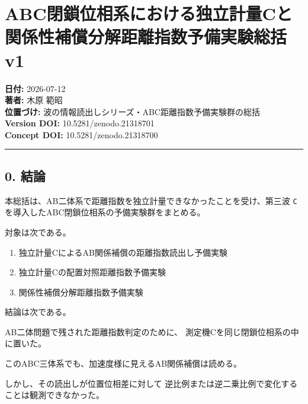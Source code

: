 \documentclass[
]{article}
\author{}
\date{}
\newenvironment{Shaded}{}{}
\newcommand{\NormalTok}[1]{#1}
\providecommand{\tightlist}{%
  \setlength{\itemsep}{0pt}\setlength{\parskip}{0pt}}
\begin{document}
\section{ABC閉鎖位相系における独立計量Cと関係性補償分解距離指数予備実験総括
v1}\label{abcux9589ux9396ux4f4dux76f8ux7cfbux306bux304aux3051ux308bux72ecux7acbux8a08ux91cfcux3068ux95a2ux4fc2ux6027ux88dcux511fux5206ux89e3ux8dddux96e2ux6307ux6570ux4e88ux5099ux5b9fux9a13ux7dcfux62ec-v1}

\textbf{日付:} 2026-07-12\\
\textbf{著者:} 木原 範昭\\
\textbf{位置づけ:} 波の情報読出しシリーズ・ABC距離指数予備実験群の総括\\
\textbf{Version DOI:} 10.5281/zenodo.21318701\\
\textbf{Concept DOI:} 10.5281/zenodo.21318700

\begin{center}\rule{0.5\linewidth}{0.5pt}\end{center}

\subsection{0. 結論}\label{ux7d50ux8ad6}

本総括は、AB二体系で距離指数を独立計量できなかったことを受け、第三波
\texttt{C} を導入したABC閉鎖位相系の予備実験群をまとめる。

対象は次である。

\begin{enumerate}
\def\labelenumi{\arabic{enumi}.}
\tightlist
\item
  独立計量CによるAB関係補償の距離指数読出し予備実験
\item
  独立計量Cの配置対照距離指数予備実験
\item
  関係性補償分解距離指数予備実験
\end{enumerate}

結論は次である。

\begin{Shaded}
\begin{Highlighting}[]
\NormalTok{AB二体問題で残された距離指数判定のために、}
\NormalTok{測定機Cを同じ閉鎖位相系の中に置いた。}

\NormalTok{このABC三体系でも、加速度様に見えるAB関係補償は読める。}

\NormalTok{しかし、その読出しが位置位相差に対して}
\NormalTok{逆比例または逆二乗比例で変化することは観測できなかった。}
\end{Highlighting}
\end{Shaded}
\end{document}
